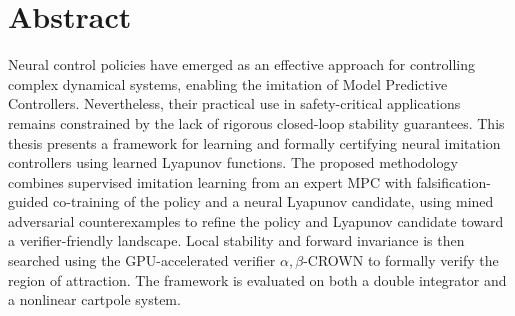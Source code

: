 \chapter*{Abstract}
\label{ch:abstract}

Neural control policies have emerged as an effective approach for controlling 
complex dynamical systems, enabling the imitation of Model Predictive Controllers. 
Nevertheless, their practical use in safety-critical applications remains constrained by the 
lack of rigorous closed-loop stability guarantees.
This thesis presents a framework for learning and formally certifying neural imitation controllers 
using learned Lyapunov functions. 
The proposed methodology combines supervised imitation learning from an expert MPC with falsification-guided 
co-training of the policy and a neural Lyapunov candidate, using mined adversarial counterexamples 
to refine the policy and Lyapunov candidate toward a verifier-friendly landscape. 
Local stability and forward invariance is then searched using 
the GPU-accelerated verifier $\alpha,\beta$-CROWN to formally verify the region of attraction. 
The framework is evaluated on both a double integrator and a nonlinear cartpole system.
